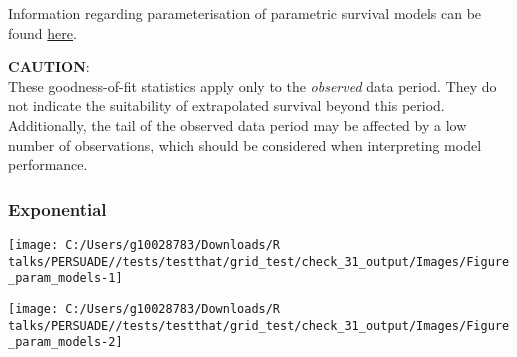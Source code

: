 \documentclass[
]{article}
\begin{document}
Information regarding parameterisation of parametric survival models can
be found
\href{https://devinincerti.com/code/survival-distributions.html}{here}.

\textbf{CAUTION}:\\
These goodness-of-fit statistics apply only to the \emph{observed} data
period. They do not indicate the suitability of extrapolated survival
beyond this period. Additionally, the tail of the observed data period
may be affected by a low number of observations, which should be
considered when interpreting model performance.

\clearpage

\begin{table}[H]
\centering
\caption{\label{tab:Table_2}Goodness of fit statistics}
\centering
{}
\end{table}

\clearpage

\clearpage

\subsubsection{Exponential}\label{exponential}

\begin{flushleft}\texttt{[image: C:/Users/g10028783/Downloads/R talks/PERSUADE//tests/testthat/grid\_test/check\_31\_output/Images/Figure\_param\_models-1]} \end{flushleft}

\begin{flushleft}\texttt{[image: C:/Users/g10028783/Downloads/R talks/PERSUADE//tests/testthat/grid\_test/check\_31\_output/Images/Figure\_param\_models-2]} \end{flushleft}
\end{document}
